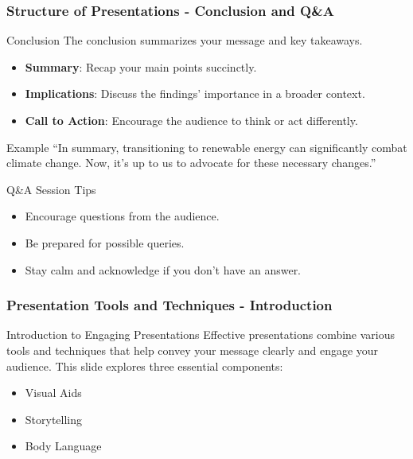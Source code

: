 \documentclass[aspectratio=169]{beamer}
\begin{document}
\begin{frame}[fragile]
    \frametitle{Structure of Presentations - Conclusion and Q\&A}
    \begin{block}{Conclusion}
        The conclusion summarizes your message and key takeaways.
    \end{block}
    
    \begin{itemize}
        \item \textbf{Summary}: Recap your main points succinctly.
        \item \textbf{Implications}: Discuss the findings' importance in a broader context.
        \item \textbf{Call to Action}: Encourage the audience to think or act differently.
    \end{itemize}
    
    \begin{block}{Example}
        “In summary, transitioning to renewable energy can significantly combat climate change. Now, it's up to us to advocate for these necessary changes.”
    \end{block}

    \begin{block}{Q\&A Session Tips}
        \begin{itemize}
            \item Encourage questions from the audience.
            \item Be prepared for possible queries.
            \item Stay calm and acknowledge if you don't have an answer.
        \end{itemize}
    \end{block}
\end{frame}

\begin{frame}[fragile]
    \frametitle{Presentation Tools and Techniques - Introduction}
    \begin{block}{Introduction to Engaging Presentations}
        Effective presentations combine various tools and techniques that help convey your message clearly and engage your audience.
        This slide explores three essential components:
        \begin{itemize}
            \item Visual Aids
            \item Storytelling
            \item Body Language
        \end{itemize}
    \end{block}
\end{frame}
\end{document}
